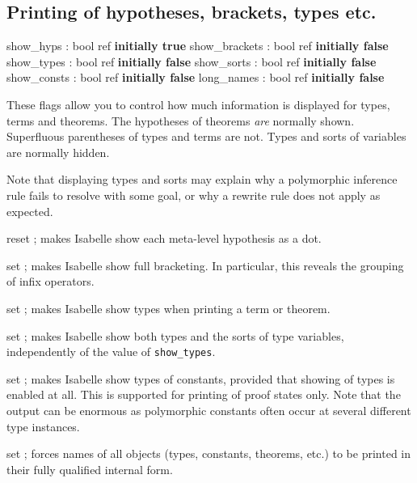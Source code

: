 \subsection{Printing of hypotheses, brackets, types etc.}
\begin{ttbox} 
show_hyps     : bool ref \hfill{\bf initially true}
show_brackets : bool ref \hfill{\bf initially false}
show_types    : bool ref \hfill{\bf initially false}
show_sorts    : bool ref \hfill{\bf initially false}
show_consts   : bool ref \hfill{\bf initially false}
long_names    : bool ref \hfill{\bf initially false}
\end{ttbox}
These flags allow you to control how much information is displayed for
types, terms and theorems.  The hypotheses of theorems \emph{are}
normally shown.  Superfluous parentheses of types and terms are not.
Types and sorts of variables are normally hidden.

Note that displaying types and sorts may explain why a polymorphic
inference rule fails to resolve with some goal, or why a rewrite rule
does not apply as expected.

\begin{ttdescription}

\item[reset \ttindexbold{show_hyps};] makes Isabelle show each
  meta-level hypothesis as a dot.
  
\item[set \ttindexbold{show_brackets};] makes Isabelle show full
  bracketing.  In particular, this reveals the grouping of infix
  operators.
  
\item[set \ttindexbold{show_types};] makes Isabelle show types when
  printing a term or theorem.
  
\item[set \ttindexbold{show_sorts};] makes Isabelle show both types
  and the sorts of type variables, independently of the value of
  \texttt{show_types}.

\item[set \ttindexbold{show_consts};] makes Isabelle show types of
  constants, provided that showing of types is enabled at all.  This
  is supported for printing of proof states only.  Note that the
  output can be enormous as polymorphic constants often occur at
  several different type instances.

\item[set \ttindexbold{long_names};] forces names of all objects
  (types, constants, theorems, etc.) to be printed in their fully
  qualified internal form.

\end{ttdescription}


